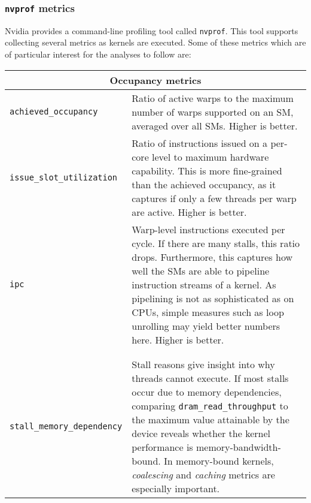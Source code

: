 \subsubsection{\texttt{nvprof} metrics} \label{sec:metrics}

Nvidia provides a command-line profiling tool called \texttt{nvprof}. This tool supports collecting several metrics as kernels are executed. Some of these metrics which are of particular interest for the analyses to follow are:

\begin{center}
\begin{longtable}{p{} p{}}
    \multicolumn{2}{c}{\textbf{Occupancy metrics}} \\
    \hline
    \hline
    
    \raggedright \texttt{achieved\_\allowbreak occupancy} & Ratio of active warps to the maximum number of warps supported on an SM, averaged over all SMs. Higher is better. \\
    \hline
    \raggedright \texttt{issue\_\allowbreak slot\_\allowbreak utilization} & Ratio of instructions issued on a per-core level to maximum hardware capability. This is more fine-grained than the achieved occupancy, as it captures if only a few threads per warp are active. Higher is better. \\
    \hline
    \raggedright \texttt{ipc} & Warp-level instructions executed per cycle. If there are many stalls, this ratio drops. Furthermore, this captures how well the SMs are able to pipeline instruction streams of a kernel. As pipelining is not as sophisticated as on CPUs, simple measures such as loop unrolling may yield better numbers here. Higher is better. \\
    
    \\
	\newpage
    \multicolumn{2}{c}{\textbf{Stall reason metrics}} \\
    \hline
    \hline
    \raggedright \texttt{stall\_\allowbreak memory\_\allowbreak dependency} & Stall reasons give insight into why threads cannot execute. If most stalls occur due to memory dependencies, comparing \texttt{dram\_read\_throughput} to the maximum value attainable by the device reveals whether the kernel performance is memory-bandwidth-bound. In memory-bound kernels, \textit{coalescing} and \textit{caching} metrics are especially important. \\
    

\end{longtable}
\end{center}
